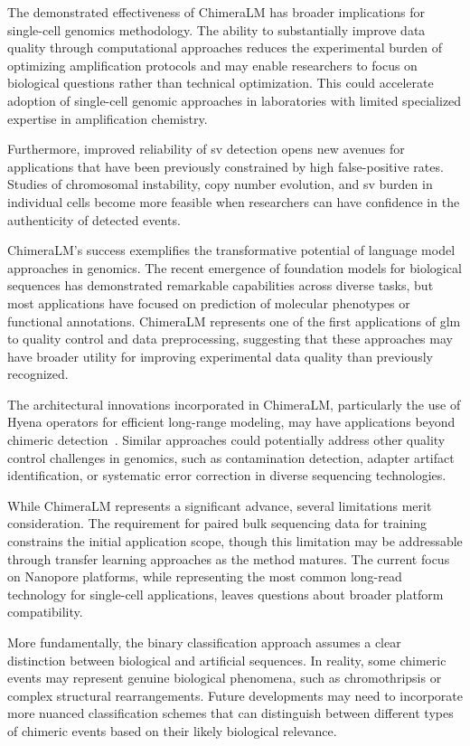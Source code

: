 \documentclass[pdflatex,sn-nature]{sn-jnl}%
\theoremstyle{thmstyleone}%
\theoremstyle{thmstyletwo}%
\theoremstyle{thmstylethree}%
\begin{document}
The demonstrated effectiveness of ChimeraLM has broader implications for single-cell genomics methodology.
The ability to substantially improve data quality through computational approaches reduces the experimental burden of optimizing amplification protocols and may enable researchers to focus on biological questions rather than technical optimization.
This could accelerate adoption of single-cell genomic approaches in laboratories with limited specialized expertise in amplification chemistry.

Furthermore, improved reliability of \gls{sv} detection opens new avenues for applications that have been previously constrained by high false-positive rates.
Studies of chromosomal instability, copy number evolution, and \gls{sv} burden in individual cells become more feasible when researchers can have confidence in the authenticity of detected events.

ChimeraLM's success exemplifies the transformative potential of language model approaches in genomics.
The recent emergence of foundation models for biological sequences has demonstrated remarkable capabilities across diverse tasks, but most applications have focused on prediction of molecular phenotypes or functional annotations.
ChimeraLM represents one of the first applications of \gls{glm} to quality control and data preprocessing, suggesting that these approaches may have broader utility for improving experimental data quality than previously recognized.

The architectural innovations incorporated in ChimeraLM, particularly the use of Hyena operators for efficient long-range modeling, may have applications beyond chimeric detection~\cite{Poli2023HyenaHT, nguyen2023hyenadna}.
Similar approaches could potentially address other quality control challenges in genomics, such as contamination detection, adapter artifact identification, or systematic error correction in diverse sequencing technologies.

While ChimeraLM represents a significant advance, several limitations merit consideration.
The requirement for paired bulk sequencing data for training constrains the initial application scope, though this limitation may be addressable through transfer learning approaches as the method matures.
The current focus on Nanopore platforms, while representing the most common long-read technology for single-cell applications, leaves questions about broader platform compatibility.

More fundamentally, the binary classification approach assumes a clear distinction between biological and artificial sequences.
In reality, some chimeric events may represent genuine biological phenomena, such as chromothripsis or complex structural rearrangements.
Future developments may need to incorporate more nuanced classification schemes that can distinguish between different types of chimeric events based on their likely biological relevance.
\end{document}
